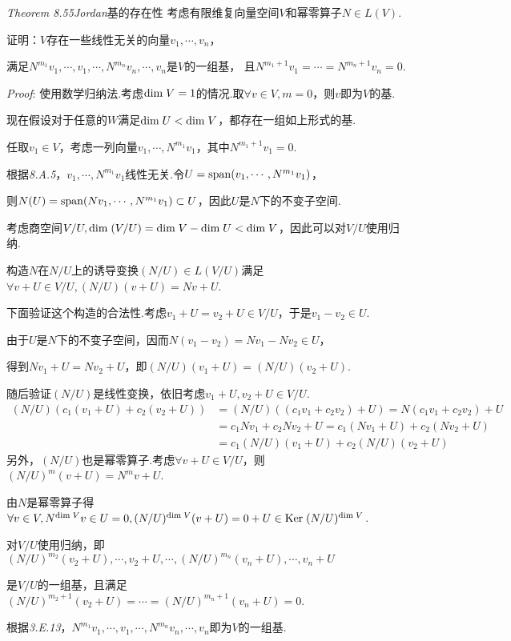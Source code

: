 \textit{Theorem 8.55}\textit{Jordan}{\kaishu 基的存在性}
考虑有限维复向量空间\(V\)和幂零算子\(N \in L(V)\).

证明：\(V\)存在一些线性无关的向量\(v_1,\cdots,v_n\)，

满足\(N^{m_1}v_1,\cdots,v_1,\cdots,N^{m_n}v_n,\cdots,v_n\)是\(V\)的一组基，
且\(N^{m_1+1}v_1=\cdots=N^{m_n+1}v_n=0\).

\textit{Proof}:
使用数学归纳法.考虑\(\mathrm{dim \;} V=1\)的情况.取\(\forall v \in V,m=0\)，则\(v\)即为\(V\)的基.

现在假设对于任意的\(W\)满足\(\mathrm{dim \;} U<\mathrm{dim \;} V\)，都存在一组如上形式的基.

任取\(v_1 \in V\)，考虑一列向量\(v_1,\cdots,N^{m_1}v_1\)，其中\(N^{m_1+1}v_1=0\).

根据\textit{8.A.5}，\(v_1,\cdots,N^{m_1}v_1\)线性无关.令\(U=\mathrm{span} (v_1,\cdots,N^{m_1}v_1)\)，

则\(N(U)=\mathrm{span} (Nv_1,\cdots,N^{m_1}v_1) \subset U\)，因此\(U\)是\(N\)下的不变子空间.

考虑商空间\(V/U,\mathrm{dim \;} (V/U)=\mathrm{dim \;} V-\mathrm{dim \;} U < \mathrm{dim \;} V\)，因此可以对\(V/U\)使用归纳.

构造\(N\)在\(N/U\)上的诱导变换\((N/U) \in L(V/U)\)满足\(\forall v+U \in V/U,(N/U)(v+U)=Nv+U\).

下面验证这个构造的合法性.考虑\(v_1+U=v_2+U \in V/U\)，于是\(v_1-v_2 \in U\).

由于\(U\)是\(N\)下的不变子空间，因而\(N(v_1-v_2)=Nv_1-Nv_2 \in U\)，

得到\(Nv_1+U=Nv_2+U\)，即\((N/U)(v_1+U)=(N/U)(v_2+U)\).

随后验证\((N/U)\)是线性变换，依旧考虑\(v_1+U,v_2+U \in V/U\).
    \begin{align*}
        (N/U)(c_1(v_1+U)+c_2(v_2+U))&=(N/U)((c_1v_1+c_2v_2)+U)=N(c_1v_1+c_2v_2)+U \\
        &=c_1Nv_1+c_2Nv_2+U=c_1(Nv_1+U)+c_2(Nv_2+U) \\
        &=c_1(N/U)(v_1+U)+c_2(N/U)(v_2+U) 
    \end{align*}
另外，\((N/U)\)也是幂零算子.考虑\(\forall v+U \in V/U\)，则\((N/U)^m(v+U)=N^m v+U\).

由\(N\)是幂零算子得\(\forall v \in V,N^{\mathrm{dim \;} V}v \in U=0,(N/U)^{\mathrm{dim \;} V}(v+U)=0+U \in \mathrm{Ker \;} (N/U)^{\mathrm{dim \;} V}\).

对\(V/U\)使用归纳，即\((N/U)^{m_2}(v_2+U),\cdots,v_2+U,\cdots,(N/U)^{m_n}(v_n+U),\cdots,v_n+U\)

是\(V/U\)的一组基，且满足\((N/U)^{m_2+1}(v_2+U)=\cdots=(N/U)^{m_n+1}(v_n+U)=0\).

根据\textit{3.E.13}，\(N^{m_1}v_1,\cdots,v_1,\cdots,N^{m_n}v_n,\cdots,v_n\)即为\(V\)的一组基.

